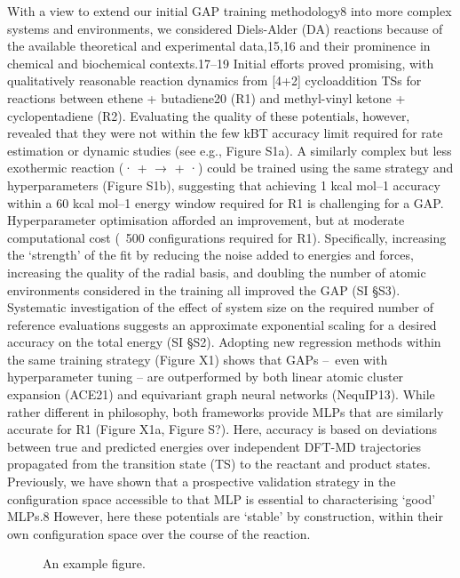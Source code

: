 \documentclass[twoside,twocolumn,9pt]{article}
\begin{document}
With a view to extend our initial GAP training methodology8 into more complex systems and environments, we considered Diels-Alder (DA) reactions because of the available theoretical and experimental data,15,16 and their prominence in chemical and biochemical contexts.17–19 Initial efforts proved promising, with qualitatively reasonable reaction dynamics from [4+2] cycloaddition TSs for reactions between ethene + butadiene20 (R1) and methyl-vinyl ketone + cyclopentadiene (R2). Evaluating the quality of these potentials, however, revealed that they were not within the few kBT accuracy limit required for rate estimation or dynamic studies (see e.g., Figure S1a). A similarly complex but less exothermic reaction (· +  $\rightarrow$  + ·) could be trained using the same strategy and hyperparameters (Figure S1b), suggesting that achieving 1 kcal mol–1 accuracy within a 60 kcal mol–1 energy window required for R1 is challenging for a GAP. Hyperparameter optimisation afforded an improvement, but at moderate computational cost (~500 configurations required for R1). Specifically, increasing the ‘strength’ of the fit by reducing the noise added to energies and forces, increasing the quality of the radial basis, and doubling the number of atomic environments considered in the training all improved the GAP (SI §S3). Systematic investigation of the effect of system size on the required number of reference evaluations suggests an approximate exponential scaling for a desired accuracy on the total energy (SI §S2). Adopting new regression methods within the same training strategy (Figure X1) shows that GAPs – even with hyperparameter tuning – are outperformed by both linear atomic cluster expansion (ACE21) and equivariant graph neural networks (NequIP13). While rather different in philosophy, both frameworks provide MLPs that are similarly accurate for R1 (Figure X1a, Figure S?). Here, accuracy is based on deviations between true and predicted energies over independent DFT-MD trajectories propagated from the transition state (TS) to the reactant and product states. Previously, we have shown that a prospective validation strategy in the configuration space accessible to that MLP is essential to characterising ‘good’ MLPs.8 However, here these potentials are ‘stable’ by construction, within their own configuration space over the course of the reaction.


\begin{figure}[h]
\centering
  \caption{An example figure.}
  \label{fgr:example}
\end{figure}
\end{document}
